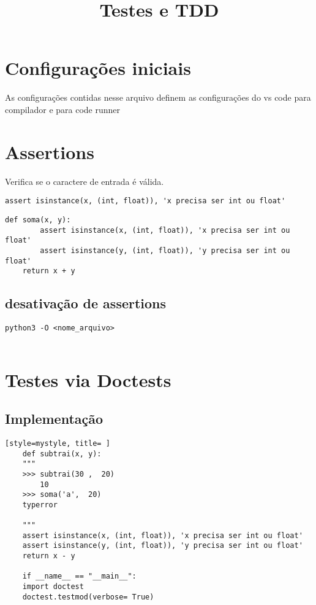 \documentclass[letterpaper]{article}
\date{} %
\title{\textbf{Testes e TDD}}
\begin{document}
\maketitle
\section{Configurações iniciais}
As configurações contidas nesse arquivo definem as configurações do vs code para compilador e para code runner


\section{Assertions}
Verifica se o caractere de entrada é válida.

\begin{lstlisting}[style=mystyle, title= assertions declaração e checagem] 
    assert isinstance(x, (int, float)), 'x precisa ser int ou float'
\end{lstlisting}

\begin{lstlisting}[style=mystyle, title=Uso no código] 
    def soma(x, y):
        assert isinstance(x, (int, float)), 'x precisa ser int ou float'
        assert isinstance(y, (int, float)), 'y precisa ser int ou float'
    return x + y

\end{lstlisting}

\subsection{desativação de assertions}

\begin{lstlisting}[style=mystyle, title=desativação shell]
    python3 -O <nome_arquivo>
    
\end{lstlisting}

\section{Testes via Doctests}
\subsection{Implementação}
\begin{lstlisting}[style=mystyle, title= ] 
    def subtrai(x, y):
    """
    >>> subtrai(30 ,  20)
        10
    >>> soma('a',  20)
    typerror

    """
    assert isinstance(x, (int, float)), 'x precisa ser int ou float'
    assert isinstance(y, (int, float)), 'y precisa ser int ou float'
    return x - y

    if __name__ == "__main__":
    import doctest
    doctest.testmod(verbose= True)


\end{lstlisting}
\end{document}
